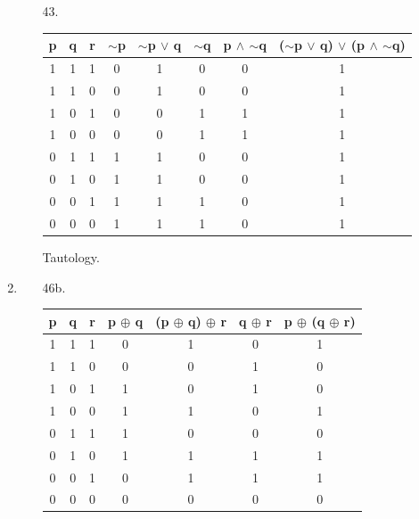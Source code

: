 \documentclass[12pt]{article}
\begin{document}
\begin{enumerate}[label = \alph*)]
\begin{itemize}
            \item [43.]
                \begin{tabular}{ccc|c|c|c|c|c}
                    p & q & r & $\sim$p & $\sim$p $\vee$ q & $\sim$q & p $\wedge$
                            $\sim$q & ($\sim$p $\vee$ q) $\vee$ (p $\wedge$ $\sim$q) \\
                    \hline
                    1 & 1 & 1 & 0 & 1 & 0 & 0 & 1 \\
                    1 & 1 & 0 & 0 & 1 & 0 & 0 & 1 \\
                    1 & 0 & 1 & 0 & 0 & 1 & 1 & 1 \\
                    1 & 0 & 0 & 0 & 0 & 1 & 1 & 1 \\
                    0 & 1 & 1 & 1 & 1 & 0 & 0 & 1 \\
                    0 & 1 & 0 & 1 & 1 & 0 & 0 & 1 \\
                    0 & 0 & 1 & 1 & 1 & 1 & 0 & 1 \\
                    0 & 0 & 0 & 1 & 1 & 1 & 0 & 1 \\
                \end{tabular}
            \item []
                \vspace{1em}
                Tautology.
        \end{itemize}
    \item
        \begin{itemize}
            \item [46b.]
                \begin{tabular}{ccc|c|c|c|c}
                    p & q & r & p $\oplus$ q & (p $\oplus$ q) $\oplus$ r &
                            q $\oplus$ r & p $\oplus$ (q $\oplus$ r) \\
                    \hline
                    1 & 1 & 1 & 0 & 1 & 0 & 1 \\
                    1 & 1 & 0 & 0 & 0 & 1 & 0 \\
                    1 & 0 & 1 & 1 & 0 & 1 & 0 \\
                    1 & 0 & 0 & 1 & 1 & 0 & 1 \\
                    0 & 1 & 1 & 1 & 0 & 0 & 0 \\
                    0 & 1 & 0 & 1 & 1 & 1 & 1 \\
                    0 & 0 & 1 & 0 & 1 & 1 & 1 \\
                    0 & 0 & 0 & 0 & 0 & 0 & 0 \\

\end{tabular}
\end{itemize}
\end{enumerate}
\end{document}
